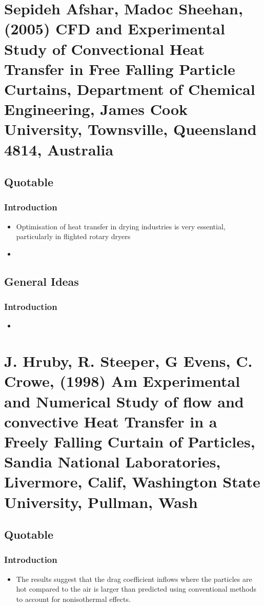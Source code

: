 \documentclass[12pt]{article}
\begin{document}
\section{Sepideh Afshar, Madoc Sheehan, (2005) CFD and Experimental Study of Convectional Heat Transfer in Free Falling Particle Curtains, Department of Chemical Engineering, James Cook University, Townsville, Queensland 4814, Australia}

\subsection{Quotable}

\subsubsection{Introduction}
\begin{itemize}
	\item Optimisation of heat transfer in drying industries is very essential, particularly in flighted rotary dryers
	\item 
\end{itemize}

\subsection{General Ideas}

\subsubsection{Introduction}
\begin{itemize}
	\item 
\end{itemize}


\section{J. Hruby, R. Steeper, G Evens, C. Crowe, (1998) Am Experimental and Numerical Study of flow and convective Heat Transfer in a Freely Falling Curtain of Particles, Sandia National Laboratories, Livermore, Calif, Washington State University, Pullman, Wash}

\subsection{Quotable}

\subsubsection{Introduction}
\begin{itemize}
	\item The results suggest that the drag coefficient inflows where the
	particles are hot compared to the air is larger than predicted using conventional
	methods to account for nonisothermal effects.
\end{itemize}
\end{document}
